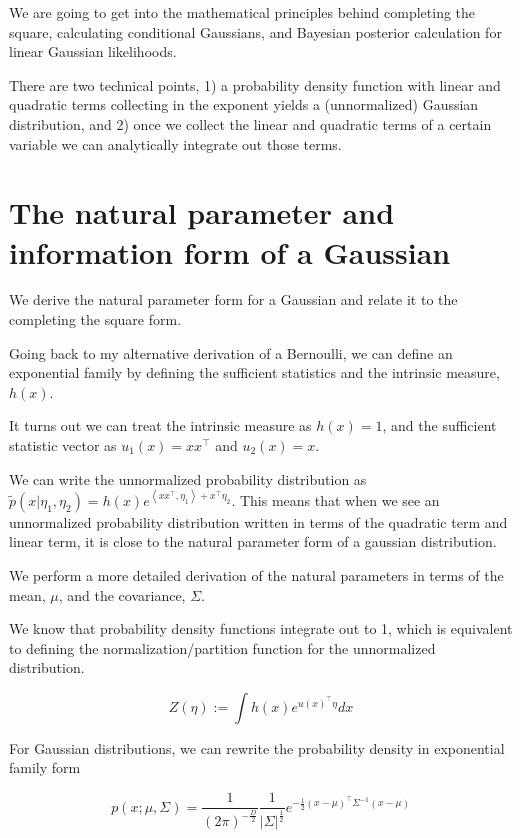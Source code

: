 \documentclass[a4paper]{article}
\begin{document}
We are going to get into the mathematical principles behind completing the square, calculating conditional Gaussians, and Bayesian posterior calculation for linear Gaussian likelihoods. 

There are two technical points, 1) a probability density function with linear and quadratic terms collecting in the exponent yields a (unnormalized) Gaussian distribution, and 2) once we collect the linear and quadratic terms of a certain variable we can analytically integrate out those terms.

\section{The natural parameter and information form of a Gaussian}

  We derive the natural parameter form for a Gaussian and relate it to the completing the square form.

  Going back to my alternative derivation of a Bernoulli, we can define an exponential family by defining the sufficient statistics and the intrinsic measure, $h(x)$.

  It turns out we can treat the intrinsic measure as $h(x) = 1$, and the sufficient statistic vector as $u_1(x) = x x^\intercal$ and $u_2(x) = x$.

  We can write the unnormalized probability distribution as $ \tilde{p}(x \vert \eta_1,\eta_2) = h(x) e^{ \left< x x^\intercal, \eta_1 \right> + x^\intercal \eta_2 }$.
This means that when we see an unnormalized probability distribution written in terms of the quadratic term and linear term, it is close to the natural parameter form of a gaussian distribution.

We perform a more detailed derivation of the natural parameters in terms of the mean, $\mu$, and the covariance, $\Sigma$.

We know that probability density functions integrate out to 1, which is equivalent to defining the normalization/partition function for the unnormalized distribution.

  \begin{equation}
    Z(\eta) := \int h(x) e^{u(x)^\intercal \eta} dx
    \label{}
  \end{equation}

  For Gaussian distributions, we can rewrite the probability density in exponential family form

\begin{equation}
  p(x; \mu,\Sigma) = 
    \frac{1}{\left( 2 \pi \right) ^{ - \frac{D}{2} } } 
    \frac{1}{\lvert \Sigma \rvert ^{ \frac{1}{2} } } 
    e^{ 
      - \frac{1}{2} \left( x - \mu \right)^\intercal 
      \Sigma^{-1}
      \left( x - \mu \right) 
    }
  \label{Gaussian}
\end{equation}
\end{document}
